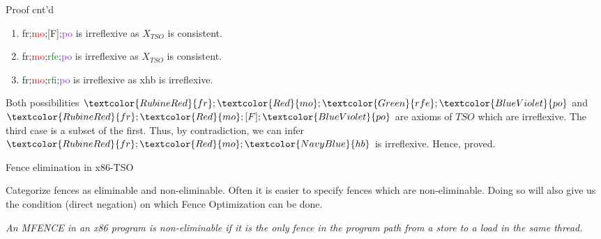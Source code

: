 \documentclass[xcolor={dvipsnames}, notes]{beamer}
\newcommand{\po}{\textcolor{BlueViolet}{po}}
\newcommand{\mo}{\textcolor{Red}{mo}}
\newcommand{\hb}{\textcolor{NavyBlue}{hb}}
\newcommand{\fr}{\textcolor{RubineRed}{fr}}
\newcommand{\xhb}{\textcolor{NavyBlue}{xhb}}
\newcommand{\rfe}{\textcolor{Green}{rfe}}
\newcommand{\rfi}{\textcolor{Green}{rfi}}
\begin{document}
    \begin{frame}{Proof cnt'd}
        
        \begin{enumerate}
            \item {\fr;\mo;[F];\po} is irreflexive as $X_{TSO}$ is consistent.
            \item {\fr;\mo;\rfe;\po} is irreflexive as $X_{TSO}$ is consistent.
            \item {\fr;\mo;\rfi;\po} is irreflexive as {\xhb} is irreflexive. 
        \end{enumerate}

        Both possibilities $\fr;\mo;\rfe;\po$ and $\fr;\mo;[F];\po$ are axioms of $TSO$ which are irreflexive.
        The third case is a subset of the first. 
        Thus, by contradiction, we can infer $\fr;\mo;\hb$ is irreflexive.
        Hence, proved.

    \end{frame}


    \begin{frame}{Fence elimination in x86-TSO}

        Categorize fences as eliminable and non-eliminable.
        Often it is easier to specify fences which are non-eliminable.
        Doing so will also give us the condition (direct negation) on which Fence Optimization can be done.

        
        \centering \textit{An \emph{MFENCE} in an x86 program is non-eliminable if it is the only fence in the program path from a store to a load in the same thread.} 
        
    \end{frame}
\end{document}
